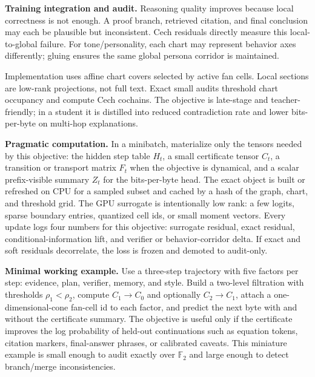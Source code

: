\documentclass[10pt]{article}
\newcommand{\FF}{\mathbb{F}}
\numberwithin{equation}{section}
\begin{document}
\noindent\textbf{Training integration and audit.} Reasoning quality improves because local correctness is not enough. A proof branch, retrieved citation, and final conclusion may each be plausible but inconsistent. Cech residuals directly measure this local-to-global failure. For tone/personality, each chart may represent behavior axes differently; gluing ensures the same global persona corridor is maintained.

Implementation uses affine chart covers selected by active fan cells. Local sections are low-rank projections, not full text. Exact small audits threshold chart occupancy and compute Cech cochains. The objective is late-stage and teacher-friendly; in a student it is distilled into reduced contradiction rate and lower bits-per-byte on multi-hop explanations.

\noindent\textbf{Pragmatic computation.} In a minibatch, materialize only the tensors needed by this objective: the hidden step table $H_t$, a small certificate tensor $C_t$, a transition or transport matrix $F_t$ when the objective is dynamical, and a scalar prefix-visible summary $Z_t$ for the bits-per-byte head. The exact object is built or refreshed on CPU for a sampled subset and cached by a hash of the graph, chart, and threshold grid. The GPU surrogate is intentionally low rank: a few logits, sparse boundary entries, quantized cell ids, or small moment vectors. Every update logs four numbers for this objective: surrogate residual, exact residual, conditional-information lift, and verifier or behavior-corridor delta. If exact and soft residuals decorrelate, the loss is frozen and demoted to audit-only.

\noindent\textbf{Minimal working example.} Use a three-step trajectory with five factors per step: evidence, plan, verifier, memory, and style. Build a two-level filtration with thresholds $\rho_1<\rho_2$, compute $C_1\to C_0$ and optionally $C_2\to C_1$, attach a one-dimensional-cone fan-cell id to each factor, and predict the next byte with and without the certificate summary. The objective is useful only if the certificate improves the log probability of held-out continuations such as equation tokens, citation markers, final-answer phrases, or calibrated caveats. This miniature example is small enough to audit exactly over $\FF_2$ and large enough to detect branch/merge inconsistencies.
\end{document}
